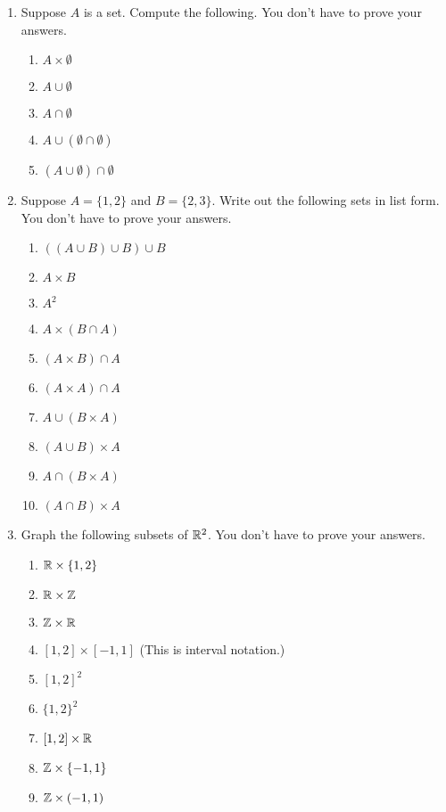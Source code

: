 \probsec{~\ref{sec:prod-union-inters}}

\begin{enumerate}
    \item Suppose $A$ is a set. Compute the following. You don't have to prove your answers.
  \begin{enumerate}
      \item $A \times \emptyset$
      \item $A \cup \emptyset$
      \item $A \cap \emptyset$
      \item $A \cup (\emptyset \cap \emptyset)$
      \item $(A \cup \emptyset) \cap \emptyset$
  \end{enumerate}

    \item Suppose $A = \{1, 2\}$ and $B = \{2, 3\}$. Write out the following sets in list form. You don't have to prove your answers.
  \begin{enumerate}
      \item $((A \cup B) \cup B) \cup B$
      \item $A \times B$
      \item $A^2$
      \item $A \times (B \cap A)$
      \item $(A \times B) \cap A$
      \item $(A \times A) \cap A$
      \item $A \cup (B \times A)$
      \item $(A \cup B) \times A$
      \item $A \cap (B \times A)$
      \item $(A \cap B) \times A$
  \end{enumerate}

    \item Graph the following subsets of $\mathbb{R}^2$. You don't have to prove your answers.
  \begin{enumerate}
      \item $\mathbb{R} \times \{1, 2\}$ 
      \item $\mathbb{R} \times \mathbb{Z}$
      \item $\mathbb{Z} \times \mathbb{R}$
      \item $[1,2] \times [-1,1]$ (This is interval notation.)
      \item $[1,2]^2$
      \item $\{1,2\}^2$
      \item $[1,2] \times \mathbb{R}$
      \item $\mathbb{Z} \times \{-1, 1\}$
      \item $\mathbb{Z} \times (-1,1)$
  \end{enumerate}


\end{enumerate}
